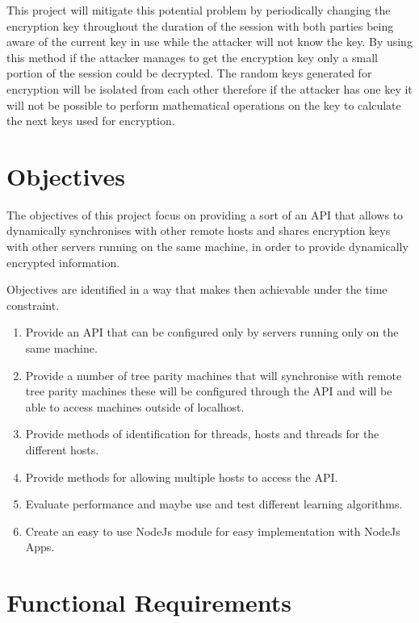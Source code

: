 This project will mitigate this potential problem by periodically changing the encryption key throughout the duration of the session with both parties being aware of the current key in use while the attacker will not know the key. By using this method if the attacker manages to get the encryption key only a small portion of the session could be decrypted. The random keys generated for encryption will be isolated from each other therefore if the attacker has one key it will not be possible to perform mathematical operations on the key to calculate the next keys used for encryption. 

\section{Objectives}
The objectives of this project focus on providing a sort of an API that allows to dynamically synchronises with other remote hosts and shares encryption keys with other servers running on the same machine, in order to provide dynamically encrypted information.

Objectives are identified in a way that makes then achievable under the time constraint.

\begin{enumerate}
	\item Provide an API that can be configured only by servers running only on the same machine.
	\item Provide a number of tree parity machines that will synchronise with remote tree parity machines these will be configured through the API and will be able to access machines outside of localhost.
	\item Provide methods of identification for threads, hosts and threads for the different hosts.
	\item Provide methods for allowing multiple hosts to access the API.
	\item Evaluate performance and maybe use and test different learning algorithms.
	\item Create an easy to use NodeJs module for easy implementation with NodeJs Apps.
\end{enumerate}

\section{Functional Requirements}

